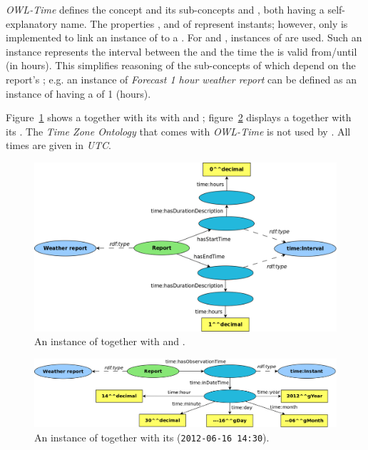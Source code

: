 \emph{OWL-Time}\cite{owl-time} defines the concept  and its sub-concepts  and , both having a self-explanatory name. The properties ,  and  of  represent instants; however, only  is implemented to link an instance of  to a . For  and , instances of  are used. Such an instance represents the interval between the  and the time the  is valid from/until (in hours). This simplifies reasoning of the sub-concepts of  which depend on the report's ; e.g. an instance of \emph{Forecast 1 hour weather report} can be defined as an instance of  having a  of \num{1} (hours).

Figure~\ref{fig:owl_time1} shows a  together with its with  and ; figure~\ref{fig:owl_time2} displays a  together with its . The \emph{Time Zone Ontology} that comes with \emph{OWL-Time} is not used by \thinkhomeweather. All times are given in \emph{UTC}.

\begin{figure}
  \includegraphics[width=\textwidth]{figures/diagrams/owl-time1.png}
  \caption{An instance of  together with  and .}
  \label{fig:owl_time1}
\end{figure}

\begin{figure}
  \includegraphics[width=\textwidth]{figures/diagrams/owl-time2.png}
  \caption{An instance of  together with its  (\texttt{2012-06-16~14:30}).}
  \label{fig:owl_time2}
\end{figure}

